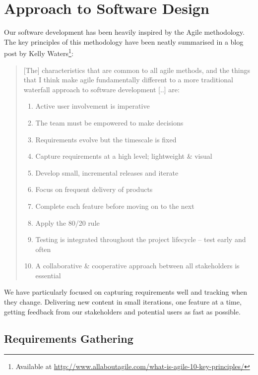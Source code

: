 \section{Approach to Software Design}
\label{sec:design_considerations}

Our software development has been heavily inspired by the Agile methodology. 
The key principles of this methodology have been neatly summarised in a blog post by Kelly Waters\footnote{Available at \url{http://www.allaboutagile.com/what-is-agile-10-key-principles/}}:

\blockquote{
    [The] characteristics that are common to all agile methods, and the things that I think make agile fundamentally different to a more traditional waterfall approach to software development [..] are:
    
    \begin{enumerate}
        \item Active user involvement is imperative 
        \item The team must be empowered to make decisions 
        \item Requirements evolve but the timescale is fixed 
        \item Capture requirements at a high level; lightweight \& visual 
        \item Develop small, incremental releases and iterate 
        \item Focus on frequent delivery of products 
        \item Complete each feature before moving on to the next 
        \item Apply the 80/20 rule 
        \item Testing is integrated throughout the project lifecycle – test early and often 
        \item A collaborative \& cooperative approach between all stakeholders is essential 
    \end{enumerate}
}

We have particularly focused on capturing requirements well and tracking when they change. 
Delivering new content in small iterations, one feature at a time, getting feedback from our stakeholders and potential users as fast as possible.

\subsection{Requirements Gathering}

